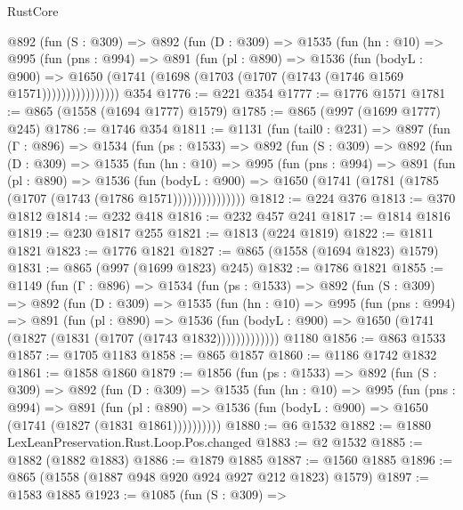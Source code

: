 \begin{lexlean}{RustCore}
\begin{coremodule}
          @892
            (fun (S : @309) =>
            @892
              (fun (D : @309) =>
              @1535
                (fun (hn : @10) =>
                @995
                  (fun (pns : @994) =>
                  @891
                    (fun (pl : @890) =>
                    @1536
                      (fun (bodyL : @900) =>
                      @1650 (@1741 (@1698 (@1703 (@1707 (@1743 (@1746 @1569 @1571))))))))))))))))
    @354
@1776 := @221 @354
@1777 := @1776 @1571
@1781 := @865 (@1558 (@1694 @1777) @1579)
@1785 := @865 (@997 (@1699 @1777) @245)
@1786 := @1746 @354
@1811 := @1131
    (fun (tail0 : @231) =>
    @897
      (fun (Γ : @896) =>
      @1534
        (fun (ps : @1533) =>
        @892
          (fun (S : @309) =>
          @892
            (fun (D : @309) =>
            @1535
              (fun (hn : @10) =>
              @995
                (fun (pns : @994) =>
                @891
                  (fun (pl : @890) =>
                  @1536
                    (fun (bodyL : @900) =>
                    @1650 (@1741 (@1781 (@1785 (@1707 (@1743 (@1786 @1571)))))))))))))))
@1812 := @224 @376
@1813 := @370 @1812
@1814 := @232 @418
@1816 := @232 @457 @241
@1817 := @1814 @1816
@1819 := @230 @1817 @255
@1821 := @1813 (@224 @1819)
@1822 := @1811 @1821
@1823 := @1776 @1821
@1827 := @865 (@1558 (@1694 @1823) @1579)
@1831 := @865 (@997 (@1699 @1823) @245)
@1832 := @1786 @1821
@1855 := @1149
    (fun (Γ : @896) =>
    @1534
      (fun (ps : @1533) =>
      @892
        (fun (S : @309) =>
        @892
          (fun (D : @309) =>
          @1535
            (fun (hn : @10) =>
            @995
              (fun (pns : @994) =>
              @891
                (fun (pl : @890) =>
                @1536
                  (fun (bodyL : @900) => @1650 (@1741 (@1827 (@1831 (@1707 (@1743 @1832)))))))))))))
    @1180
@1856 := @863 @1533
@1857 := @1705 @1183
@1858 := @865 @1857
@1860 := @1186 @1742 @1832
@1861 := @1858 @1860
@1879 := @1856
    (fun (ps : @1533) =>
    @892
      (fun (S : @309) =>
      @892
        (fun (D : @309) =>
        @1535
          (fun (hn : @10) =>
          @995
            (fun (pns : @994) =>
            @891
              (fun (pl : @890) =>
              @1536 (fun (bodyL : @900) => @1650 (@1741 (@1827 (@1831 @1861))))))))))
@1880 := @6 @1532
@1882 := @1880 LexLeanPreservation.Rust.Loop.Pos.changed
@1883 := @2 @1532
@1885 := @1882 (@1882 @1883)
@1886 := @1879 @1885
@1887 := @1560 @1885
@1896 := @865 (@1558 (@1887 @948 @920 @924 @927 @212 @1823) @1579)
@1897 := @1583 @1885
@1923 := @1085
    (fun (S : @309) =>

\end{coremodule}
\end{lexlean}
